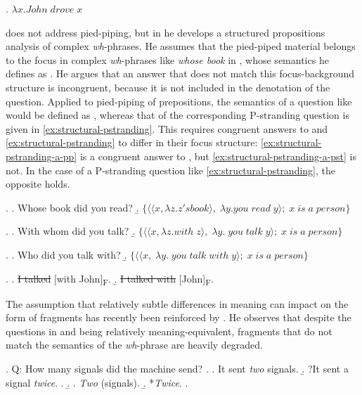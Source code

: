 \ex. $\lambda x. John\;drove\;x$

\citet{reich2002a} does not address pied-piping, but in \citet{reich2002} he develops a structured propositions analysis of complex \textit{wh}-phrases. He assumes that the pied-piped material belongs to the focus in complex \textit{wh}-phrases like \textit{whose book} in \Next[a], whose semantics he defines as \Next[b]. He argues that an answer that does not match this focus-background structure is incongruent, because it is not included in the denotation of the question. Applied to pied-piping of prepositions, the semantics of a question like \NNext[a] would be defined as \NNext[b], whereas that of the corresponding P-stranding question is given in \ref{ex:structural-pstranding}. This requires congruent answers to \NNext and \ref{ex:structural-pstranding} to differ in their focus structure: \ref{ex:structural-pstranding-a-pp} is a congruent answer to \NNext, but \ref{ex:structural-pstranding-a-pst} is not. In the case of a P-stranding question like \ref{ex:structural-pstranding}, the opposite holds.

\ex. \a. Whose book did you read?\hfill\citep{reich2002}
    \b. $\{\langle\langle x, \lambda z . z's book \rangle ,\;\lambda y . you\;read\;y \rangle;\; x \; is \; a \; person\}$
    
\ex. \a. With whom did you talk?
    \b. $\{\langle\langle x, \lambda z . with\; z \rangle ,\;\lambda y.\; you\;talk\;y \rangle;\; x \; is \; a \; person\}$

\ex. \label{ex:structural-pstranding}
\a. Who did you talk with?
    \b. $\{\langle\langle x,\;\lambda y.\; you\;talk\;with\;y \rangle;\; x \; is \; a \; person\}$

\ex. \a. \sout{I talked} [with John]\textsubscript{\textsc{F}}.\label{ex:structural-pstranding-a-pp}
     \b.  \sout{I talked with} [John]\textsubscript{\textsc{F}}.\label{ex:structural-pstranding-a-pst}

The assumption that relatively subtle differences in meaning can impact on the form of fragments has recently been reinforced by \citet{weir2018}. He observes that despite the questions in \Next and \NNext being relatively meaning-equivalent, fragments that do not match the semantics of the \textit{wh}-phrase are heavily degraded.

\ex. \label{ex:weir-qa-ex1}
 Q: How many signals did the machine send? \hfill \citep[1289]{weir2018}
\a.  \a. It sent \textit{two} signals.
\b. ?It sent a signal \textit{twice}.
\z.
\b. \a. \textit{Two} (signals).
\b. *\textit{Twice}.
\z.

